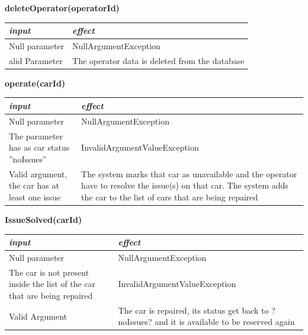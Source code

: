 \documentclass{article}
\begin{document}
\begin{flushleft}
   
  \begin{center}
   \begin {flushleft}
    \textbf{deleteOperator(operatorId)}
    \end{flushleft}
        \begin{tabular}{  |  p{6cm} | p{6cm} |}
    \hline
    \textit{input} &  \textit{effect} \\
    \hline
    
      Null parameter & NullArgumentException
     \\ 
  \hline
   alid Parameter &  The operator data is deleted from the database\\
  \hline

    \end{tabular}
\end{center}


   
  \begin{center}
   \begin {flushleft}
    \textbf{operate(carId)}
    \end{flushleft}
        \begin{tabular}{  |  p{6cm} | p{6cm} |}
    \hline
    \textit{input} &  \textit{effect} \\
    \hline
    
    Null parameter & NullArgumentException
     \\ 
  \hline
   The parameter has as  car status ''noIssues'' &  InvalidArgumentValueException \\
  \hline
Valid argument, the car has at least one issue  &  The system marks that car as unavailable and the operator have to resolve the issue(s) on that car. The system adds the car to the list of cars that are being repaired  \\
  \hline
    \end{tabular}
\end{center}


   
  \begin{center}
   \begin {flushleft}
    \textbf{IssueSolved(carId)}
    \end{flushleft}
        \begin{tabular}{  |  p{6cm} | p{6cm} |}
    \hline
    \textit{input} &  \textit{effect} \\
    \hline
    
    Null parameter & NullArgumentException
     \\ 
  \hline
   The car is not present inside the list of the car that are being repaired &  InvalidArgumentValueException\\
  \hline
 Valid Argument & The car is repaired, its status get back to ?noIssues? and it is available to be reserved again    \\
  \hline
    \end{tabular}
\end{center}





\end{flushleft}
\end{document}

